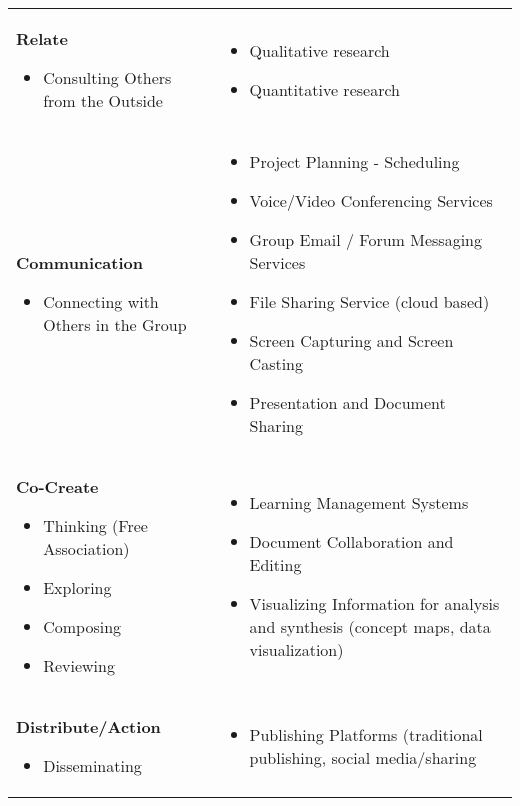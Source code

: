 {{\begin{tabular}{p{}p{}@{\hspace{.2in}}}
\textbf{Relate}
\begin{itemize}[noitemsep]
\item
  Consulting Others from the Outside
\end{itemize} &
\begin{itemize}[noitemsep]
\item
  Qualitative research
\item
  Quantitative research
\end{itemize} \\
\textbf{Communication}
\begin{itemize}[noitemsep]
\item
  Connecting with Others in the Group
\end{itemize} &
\begin{itemize}[noitemsep]
\item
  Project Planning - Scheduling
\item
  Voice/Video Conferencing Services
\item
  Group Email / Forum Messaging Services
\item
  File Sharing Service (cloud based)
\item
  Screen Capturing and Screen Casting
\item
  Presentation and Document Sharing
\end{itemize} \\
\textbf{Co-Create}
\begin{itemize}[noitemsep]
\item
  Thinking (Free Association)
\item
  Exploring
\item
  Composing
\item
  Reviewing
\end{itemize} &
\begin{itemize}[noitemsep]
\item
  Learning Management Systems
\item
  Document Collaboration and Editing
\item
  Visualizing Information for analysis and synthesis (concept maps, data
  visualization)
\end{itemize} \\
\textbf{Distribute/Action}
\begin{itemize}[noitemsep]
\item
  Disseminating
\end{itemize} &
\begin{itemize}[noitemsep]
\item
  Publishing Platforms (traditional publishing, social media/sharing

\end{itemize}
\end{tabular}}}
